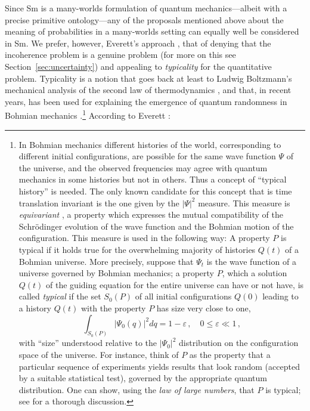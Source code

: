 \documentclass[12pt]{article}
\newcommand{\x}[1]{{#1}}
\begin{document}
Since Sm is a many-worlds formulation of quantum mechanics---albeit with a precise primitive ontology---any of the proposals mentioned above about the meaning of probabilities in a many-worlds setting can equally well be considered in Sm. We prefer, however, Everett's approach \cite{evethesis, Eve57}, that of \x{denying that the incoherence problem is a genuine problem (for more on this see Section~\ref{sec:uncertainty}) and appealing to {\em typicality} for the quantitative problem. Typicality is} a notion that goes back at least to Ludwig Boltzmann's mechanical analysis of the  second law of thermodynamics \cite{golsteinstat}, and that, in recent years, has been used for explaining the emergence of quantum randomness in Bohmian mechanics \cite{DGZ92}.\footnote{In  Bohmian mechanics  different histories of the world, corresponding to different initial configurations, are possible for the same wave function $\Psi$ of the universe, and the observed frequencies may agree with quantum mechanics in some histories but not in others. Thus a concept of ``typical history'' is needed. The only known candidate for this concept that is time translation invariant is the one given by the $|\Psi|^2$ measure. This measure is {\em equivariant} \cite{DGZ92}, a property which expresses the mutual compatibility of the Schr\"odinger evolution of the wave function and the Bohmian motion of the configuration.  This measure is used in the following way:
A property $P$ is typical if it holds true for the
overwhelming majority of histories $Q(t)$ of a Bohmian universe. More
precisely, suppose that $\Psi_t$ is the wave function of a universe
governed by Bohmian mechanics; a property $P$, which a solution $Q(t)$ of
the guiding equation for the entire universe can have or not have, is
called \emph{typical} if the set $S_0(P)$ of all initial configurations
$Q(0)$ leading to a history $Q(t)$ with the property $P$ has size very
close to one,
\begin{equation}\label{typ}
  \int_{S_0(P)} |\Psi_0 (q)|^2 dq= 1 - \varepsilon\,, \quad 0 \leq
  \varepsilon \ll 1\,,
\end{equation}
with ``size'' understood relative to the $|\Psi_0|^2$ distribution on the
configuration space of the universe.  For instance, think of $P$ as the
property that a particular sequence of experiments yields results that look
random (accepted by a suitable statistical test), governed by the
appropriate quantum distribution.  One can show, using the {\em law of large
numbers}, that $P$ is typical; see \cite{DGZ92} for a thorough
discussion.}  
According to Everett \cite{Eve57}: 
\end{document}
